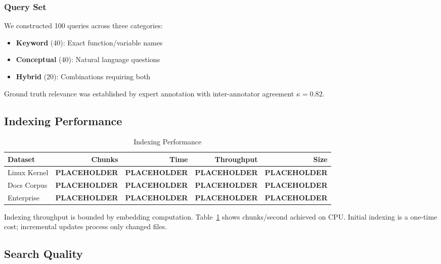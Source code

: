 \documentclass[conference]{IEEEtran}
\begin{document}
\subsubsection{Query Set}

We constructed 100 queries across three categories:
\begin{itemize}
    \item \textbf{Keyword} (40): Exact function/variable names
    \item \textbf{Conceptual} (40): Natural language questions
    \item \textbf{Hybrid} (20): Combinations requiring both
\end{itemize}

Ground truth relevance was established by expert annotation with inter-annotator agreement $\kappa = 0.82$.

\subsection{Indexing Performance}

\begin{table}[htbp]
\caption{Indexing Performance}
\begin{center}
\begin{tabular}{lrrrr}
\toprule
\textbf{Dataset} & \textbf{Chunks} & \textbf{Time} & \textbf{Throughput} & \textbf{Size} \\
\midrule
Linux Kernel & \textbf{PLACEHOLDER} & \textbf{PLACEHOLDER} & \textbf{PLACEHOLDER} & \textbf{PLACEHOLDER} \\
Docs Corpus & \textbf{PLACEHOLDER} & \textbf{PLACEHOLDER} & \textbf{PLACEHOLDER} & \textbf{PLACEHOLDER} \\
Enterprise & \textbf{PLACEHOLDER} & \textbf{PLACEHOLDER} & \textbf{PLACEHOLDER} & \textbf{PLACEHOLDER} \\
\bottomrule
\end{tabular}
\label{tab:indexing}
\end{center}
\end{table}

Indexing throughput is bounded by embedding computation. Table~\ref{tab:indexing} shows chunks/second achieved on CPU. Initial indexing is a one-time cost; incremental updates process only changed files.

\subsection{Search Quality}
\end{document}
